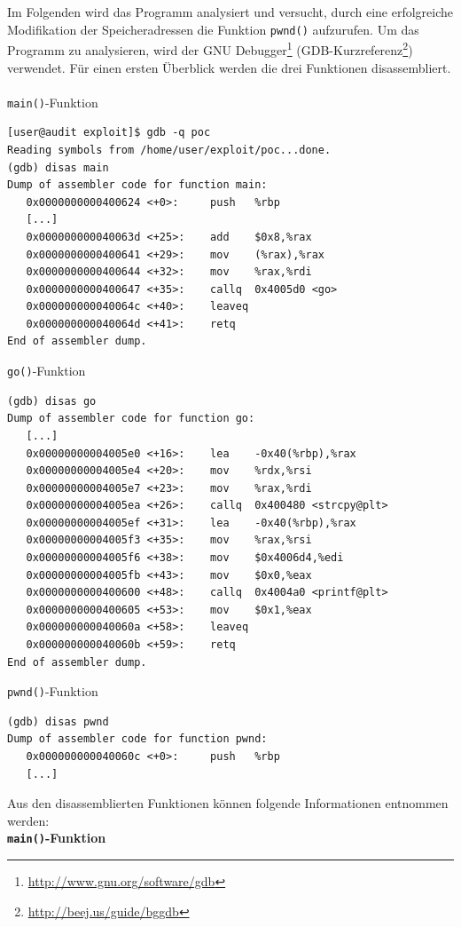 \newpage
Im Folgenden wird das Programm analysiert und versucht, durch eine erfolgreiche Modifikation der Speicheradressen die Funktion \texttt{pwnd()} aufzurufen.
Um das Programm zu analysieren, wird der GNU Debugger\footnote{\url{http://www.gnu.org/software/gdb}} 
(GDB-Kurzreferenz\footnote{\url{http://beej.us/guide/bggdb}}) verwendet. 
Für einen ersten Überblick werden die drei Funktionen disassembliert.
\\
\\
\texttt{main()}-Funktion
\begin{lstlisting}[basicstyle=\ttfamily\footnotesize]
[user@audit exploit]$ gdb -q poc
Reading symbols from /home/user/exploit/poc...done.
(gdb) disas main
Dump of assembler code for function main:
   0x0000000000400624 <+0>:     push   %rbp
   [...]
   0x000000000040063d <+25>:    add    $0x8,%rax
   0x0000000000400641 <+29>:    mov    (%rax),%rax
   0x0000000000400644 <+32>:    mov    %rax,%rdi
   0x0000000000400647 <+35>:    callq  0x4005d0 <go>
   0x000000000040064c <+40>:    leaveq
   0x000000000040064d <+41>:    retq
End of assembler dump.
\end{lstlisting}


\texttt{go()}-Funktion
\begin{lstlisting}[basicstyle=\ttfamily\footnotesize]
(gdb) disas go
Dump of assembler code for function go:
   [...]
   0x00000000004005e0 <+16>:    lea    -0x40(%rbp),%rax
   0x00000000004005e4 <+20>:    mov    %rdx,%rsi
   0x00000000004005e7 <+23>:    mov    %rax,%rdi
   0x00000000004005ea <+26>:    callq  0x400480 <strcpy@plt>
   0x00000000004005ef <+31>:    lea    -0x40(%rbp),%rax
   0x00000000004005f3 <+35>:    mov    %rax,%rsi
   0x00000000004005f6 <+38>:    mov    $0x4006d4,%edi
   0x00000000004005fb <+43>:    mov    $0x0,%eax
   0x0000000000400600 <+48>:    callq  0x4004a0 <printf@plt>
   0x0000000000400605 <+53>:    mov    $0x1,%eax
   0x000000000040060a <+58>:    leaveq
   0x000000000040060b <+59>:    retq
End of assembler dump.
\end{lstlisting}

\newpage
\texttt{pwnd()}-Funktion
\begin{lstlisting}[basicstyle=\ttfamily\footnotesize]
(gdb) disas pwnd
Dump of assembler code for function pwnd:
   0x000000000040060c <+0>:     push   %rbp
   [...]
\end{lstlisting}
\par\medskip 
Aus den disassemblierten Funktionen können folgende Informationen entnommen werden:
\\
\textbf{\texttt{main()}-Funktion}


